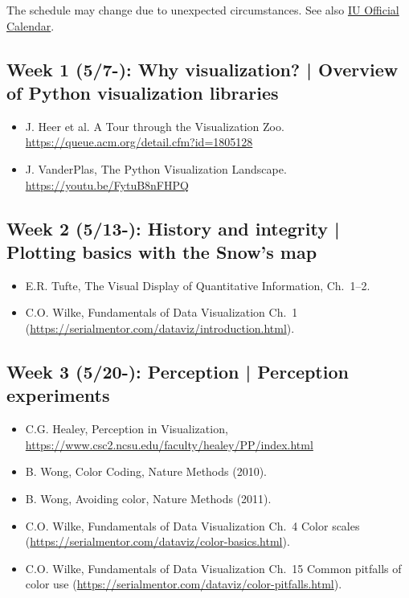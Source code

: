 \documentclass[11pt,article,oneside]{memoir} %
\begin{document}
The schedule may change due to unexpected circumstances. See also \href{https://registrar.indiana.edu/official-calendar/official-calendar-summer.shtml}{IU Official Calendar}. 

\subsection{Week 1 (5/7-): Why visualization? | Overview of Python visualization libraries} %

\begin{itemize}\itemsep0em 
\item J. Heer et al. A Tour through the Visualization Zoo. \url{https://queue.acm.org/detail.cfm?id=1805128}
\item J. VanderPlas, The Python Visualization Landscape. \url{https://youtu.be/FytuB8nFHPQ}
\end{itemize}	
\subsection{Week 2 (5/13-): History and integrity | Plotting basics with the Snow's map }%

\begin{itemize}\itemsep0em 
\item E.R. Tufte, The Visual Display of Quantitative Information, Ch.~1--2.
\item C.O. Wilke, Fundamentals of Data Visualization Ch.~1 (\url{https://serialmentor.com/dataviz/introduction.html}). 
\end{itemize}	


\subsection{Week 3 (5/20-): Perception | Perception experiments }%

\begin{itemize}\itemsep0em 
\item C.G. Healey, Perception in Visualization, \url{https://www.csc2.ncsu.edu/faculty/healey/PP/index.html}
\item B. Wong, Color Coding, Nature Methods (2010).
\item B. Wong, Avoiding color, Nature Methods (2011). 
\item C.O. Wilke, Fundamentals of Data Visualization Ch.~4 Color scales (\url{https://serialmentor.com/dataviz/color-basics.html}). 
\item C.O. Wilke, Fundamentals of Data Visualization Ch.~15 Common pitfalls of color use (\url{https://serialmentor.com/dataviz/color-pitfalls.html}).
\end{itemize}	
\end{document}
